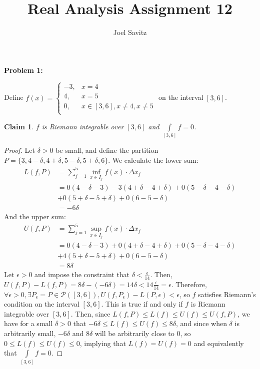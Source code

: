 \documentclass{article}
\title{Real Analysis Assignment 12}
\author{Joel Savitz}
\newcommand{\eps}{\ensuremath{\epsilon}}
\newcommand{\infx}[1]{\ensuremath{\underset{#1}{\inf}}}
\newcommand{\supx}[1]{\ensuremath{\underset{#1}{\sup}}}
\newtheorem{clm}{Claim}
\begin{document}
\maketitle

\textbf{Problem 1:}

Define $f(x) = \begin{cases}
	-3, & x = 4 \\
	4, & x = 5 \\
	0, & x \in [3,6], x \neq 4, x \neq 5 \\
\end{cases}$ on the interval $[3,6]$.

\begin{clm}
	$f$ is Riemann integrable over $[3,6]$ and $\underset{[3,6]}{\int}f = 0$.
\end{clm}

\begin{proof}
	Let $\delta > 0$ be small,
	and define the partition
	$P = \{ 3, 4-\delta, 4+\delta, 5-\delta, 5+\delta, 6 \}$.
	We calculate the lower sum:
	\begin{align}
		L(f,P)   &= \sum_{j=1}^5 \infx{x \in I_j} f(x) \cdot \Delta x_j \\
			 & = 0(4-\delta - 3) -3(4+\delta-4+\delta) + 0(5-\delta-4-\delta) \nonumber \\
			 &+ 0(5+\delta-5+\delta) + 0(6 - 5 - \delta) \\
			 &= -6\delta
	\end{align}
	And the upper sum:
	\begin{align}
		U(f,P)   &= \sum_{j=1}^5 \supx{x \in I_j} f(x) \cdot \Delta x_j \\
			 & = 0(4-\delta - 3) + 0(4+\delta-4+\delta) + 0(5-\delta-4-\delta) \nonumber \\
			 &+ 4(5+\delta-5+\delta) + 0(6 - 5 - \delta) \\
			 &= 8\delta
	\end{align}
	Let $\eps > 0$ and impose the constraint that $\delta < \frac{\eps}{14}$.
	Then, $U(f,P) - L(f,P) = 8\delta - (-6\delta) = 14\delta < 14\frac{\eps}{14} = \eps$.
	Therefore,
	$\forall \eps > 0,
	\exists P_\eps = P \in \mathcal{P}([3,6]),
	U(f,P_\eps) - L(P,\eps) < \eps$,
	so $f$ satisfies Riemann's condition
	on the interval $[3,6]$.
	This is true if and only if
	$f$ is Riemann integrable over $[3,6]$.
	Then, since $L(f,P) \le L(f) \le U(f) \le U(f,P)$,
	we have for a small $\delta > 0$
	that $-6\delta \le L(f) \le U(f) \le 8\delta$,
	and since when $\delta$ is  arbitrarily small,
	$-6\delta$ and $8\delta$ will be arbitrarily close to $0$,
	so $0 \le L(f) \le U(f) \le 0$,
	implying that $L(f) = U(f) = 0$
	and equivalently that 
	$\underset{[3,6]}{\int}f = 0$.
\end{proof}
\end{document}
